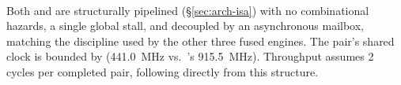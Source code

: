 \begin{table}[t]
  \centering
  \caption{Useful throughput per format, Nangate45 \SI{45}{\nano\meter}.
           One FLOP is one multiply or one add.}
  \label{tab:residue}
  \setlength{\tabcolsep}{2.2pt}
  \renewcommand{\arraystretch}{1.15}
  \\[2pt]
  \begin{minipage}{\columnwidth}
    \footnotesize
    Both  and  are structurally pipelined (\S\ref{sec:arch-isa}) with no combinational hazards, a single global stall, and decoupled by an asynchronous mailbox, matching the discipline used by the other three fused engines. The pair's shared clock is bounded by  (\SI{441.0}{\mega\hertz} vs.\ 's \SI{915.5}{\mega\hertz}). Throughput assumes 2 cycles per completed pair, following directly from this structure.
  \end{minipage}
\end{table}
